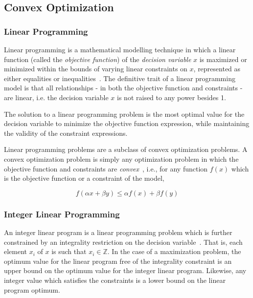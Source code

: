 \documentclass[../mthe-493-final-project.tex]{subfiles}
\begin{document}
    \subsection{Convex Optimization}
    \label{ssec:convex-optimization}

    \subsubsection{Linear Programming}
    \label{sssec:linear-programming}
    
        Linear programming is a mathematical modelling technique in which a linear function (called the \textit{objective function}) of the \textit{decision variable} $x$ is maximized or minimized within the bounds of varying linear constraints on $x$, represented as either equalities or inequalities~\cite{the_editors_of_encyclopaedia_britannica_2017}. The definitive trait of a linear programming model is that all relationships - in both the objective function and constraints - are linear, i.e. the decision variable $x$ is not raised to any power besides 1.
        
        The solution to a linear programming problem is the most optimal value for the decision variable to minimize the objective function expression, while maintaining the validity of the constraint expressions.
        
        Linear programming problems are a subclass of convex optimization problems. A convex optimization problem is simply any optimization problem in which the objective function and constraints are \textit{convex}~\cite{boyd_vandenberghe_2009}, i.e., for any function $f(x)$ which is the objective function or a constraint of the model, 
        
        \[ f(\alpha x + \beta y) \leq \alpha f(x) + \beta f(y) \]
    
    \subsubsection{Integer Linear Programming}
    
    
    \label{sssec:integer-linear-programming}

        An integer linear program is a linear programming problem which is further constrained by an integrality restriction on the decision variable~\cite{integer_programming}. That is, each element $x_i$ of $x$ is such that $x_i \in \mathbb{Z}$. In the case of a maximization problem, the optimum value for the linear program free of the integrality constraint is an upper bound on the optimum value for the integer linear program. Likewise, any integer value which satisfies the constraints is a lower bound on the linear program optimum.
\end{document}
